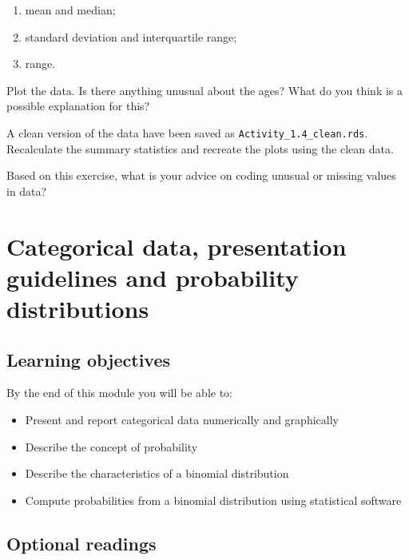 \documentclass[
  a4paper,
]{memoir}
\providecommand{\tightlist}{%
  \setlength{\itemsep}{0pt}\setlength{\parskip}{0pt}}
\begin{document}
\begin{enumerate}
\def\labelenumi{\alph{enumi}.}
\tightlist
\item
  mean and median;
\item
  standard deviation and interquartile range;
\item
  range.
\end{enumerate}

Plot the data. Is there anything unusual about the ages? What do you
think is a possible explanation for this?

A clean version of the data have been saved as
\texttt{Activity\_1.4\_clean.rds}. Recalculate the summary statistics
and recreate the plots using the clean data.

Based on this exercise, what is your advice on coding unusual or missing
values in data?


\chapter{Categorical data, presentation guidelines and probability
distributions}\label{categorical-data-presentation-guidelines-and-probability-distributions}

\section*{Learning objectives}\label{learning-objectives-1}


By the end of this module you will be able to:

\begin{itemize}
\tightlist
\item
  Present and report categorical data numerically and graphically
\item
  Describe the concept of probability
\item
  Describe the characteristics of a binomial distribution
\item
  Compute probabilities from a binomial distribution using statistical
  software
\end{itemize}

\section*{Optional readings}\label{optional-readings-1}
\end{document}
